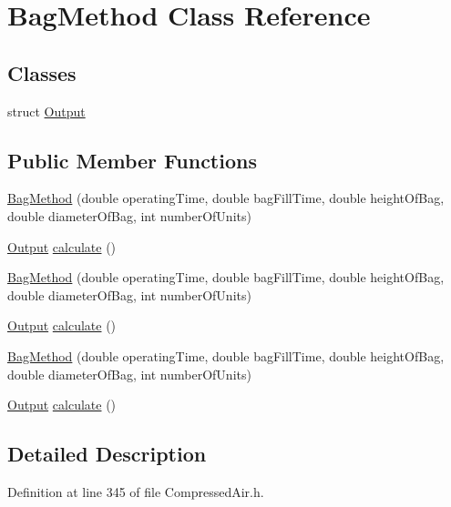 \hypertarget{class_bag_method}{}\section{Bag\+Method Class Reference}
\label{class_bag_method}
\subsection*{Classes}
\begin{DoxyCompactItemize}
\item 
struct \hyperlink{struct_bag_method_1_1_output}{Output}
\end{DoxyCompactItemize}
\subsection*{Public Member Functions}
\begin{DoxyCompactItemize}
\item 
\hyperlink{class_bag_method_ade40cf50da337fb5f83aae1d72698b56}{Bag\+Method} (double operating\+Time, double bag\+Fill\+Time, double height\+Of\+Bag, double diameter\+Of\+Bag, int number\+Of\+Units)
\item 
\hyperlink{struct_bag_method_1_1_output}{Output} \hyperlink{class_bag_method_ab0a8d6b47bf81afbef47d8aaf1c1943c}{calculate} ()
\item 
\hyperlink{class_bag_method_ade40cf50da337fb5f83aae1d72698b56}{Bag\+Method} (double operating\+Time, double bag\+Fill\+Time, double height\+Of\+Bag, double diameter\+Of\+Bag, int number\+Of\+Units)
\item 
\hyperlink{struct_bag_method_1_1_output}{Output} \hyperlink{class_bag_method_afe5b5d6bf23f8af18ad0c75edac1eb4d}{calculate} ()
\item 
\hyperlink{class_bag_method_ade40cf50da337fb5f83aae1d72698b56}{Bag\+Method} (double operating\+Time, double bag\+Fill\+Time, double height\+Of\+Bag, double diameter\+Of\+Bag, int number\+Of\+Units)
\item 
\hyperlink{struct_bag_method_1_1_output}{Output} \hyperlink{class_bag_method_afe5b5d6bf23f8af18ad0c75edac1eb4d}{calculate} ()
\end{DoxyCompactItemize}


\subsection{Detailed Description}


Definition at line 345 of file Compressed\+Air.\+h.



